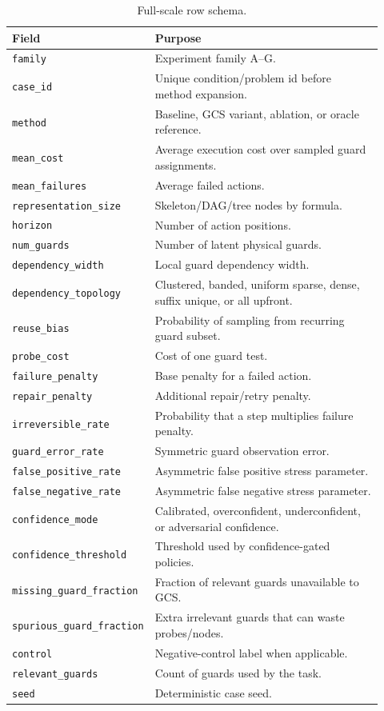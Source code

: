 \documentclass{article}
\begin{document}
\begin{table}[p]
\centering
\caption{Full-scale row schema.}
\label{tab:row-schema}
\scriptsize
\begin{tabular}{p{0.25\linewidth}p{0.67\linewidth}}
\toprule
Field & Purpose \\
\midrule
\texttt{family} & Experiment family A--G.\\
\texttt{case\_id} & Unique condition/problem id before method expansion.\\
\texttt{method} & Baseline, GCS variant, ablation, or oracle reference.\\
\texttt{mean\_cost} & Average execution cost over sampled guard assignments.\\
\texttt{mean\_failures} & Average failed actions.\\
\texttt{representation\_size} & Skeleton/DAG/tree nodes by formula.\\
\texttt{horizon} & Number of action positions.\\
\texttt{num\_guards} & Number of latent physical guards.\\
\texttt{dependency\_width} & Local guard dependency width.\\
\texttt{dependency\_topology} & Clustered, banded, uniform sparse, dense, suffix unique, or all upfront.\\
\texttt{reuse\_bias} & Probability of sampling from recurring guard subset.\\
\texttt{probe\_cost} & Cost of one guard test.\\
\texttt{failure\_penalty} & Base penalty for a failed action.\\
\texttt{repair\_penalty} & Additional repair/retry penalty.\\
\texttt{irreversible\_rate} & Probability that a step multiplies failure penalty.\\
\texttt{guard\_error\_rate} & Symmetric guard observation error.\\
\texttt{false\_positive\_rate} & Asymmetric false positive stress parameter.\\
\texttt{false\_negative\_rate} & Asymmetric false negative stress parameter.\\
\texttt{confidence\_mode} & Calibrated, overconfident, underconfident, or adversarial confidence.\\
\texttt{confidence\_threshold} & Threshold used by confidence-gated policies.\\
\texttt{missing\_guard\_fraction} & Fraction of relevant guards unavailable to GCS.\\
\texttt{spurious\_guard\_fraction} & Extra irrelevant guards that can waste probes/nodes.\\
\texttt{control} & Negative-control label when applicable.\\
\texttt{relevant\_guards} & Count of guards used by the task.\\
\texttt{seed} & Deterministic case seed.\\
\bottomrule
\end{tabular}
\end{table}
\end{document}
